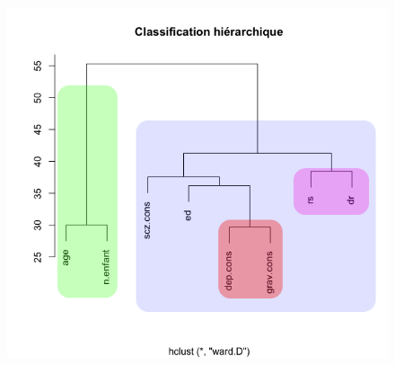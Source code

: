 \begin{figure}[H]\begin{center}\includegraphics[scale=0.5]{ilu/ClassGraphColor.png}\end{center}\end{figure}

